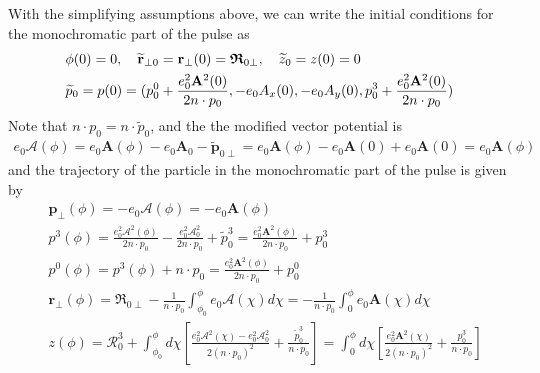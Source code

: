 With the simplifying assumptions above, we can write the initial conditions for the monochromatic part of the pulse as
\begin{align}
   & \phi(0) = 0, \quad \widetilde{\bf r}_{\perp0}={\bf r}_{\perp}(0) = {\boldsymbol{\mathfrak R}}_{0 \perp}, \quad \widetilde z_0=z(0) = 0\nonumber                         \\
   & \widetilde p_0=p(0) = (p_0^0 + \frac{e_{0}^{2} \mathbf{A}^{2}(0)}{2 n \cdot p_{0}},-e_0A_x(0), -e_0A_y(0), p_0^3 + \frac{e_{0}^{2} \mathbf{A}^{2}(0)}{2 n \cdot p_{0}})
\end{align}
Note that $n\cdot p_0 = n\cdot  \widetilde p_0$, and  the  the modified vector potential is
\begin{align}
  e_{0} \boldsymbol{\mathcal{A}}(\phi)=e_{0} \mathbf{A}(\phi)-e_{0} \mathbf{A}_{0}-\widetilde{\mathbf{p}}_{0 \perp}=e_{0} \mathbf{A}(\phi)-e_{0} \mathbf{A}(0)+e_0 {\mathbf{A}}(0) = e_{0} \mathbf{A}(\phi)
\end{align}
and the trajectory of the particle in the monochromatic part of the pulse is given by
\begin{align}
   & \mathbf{p}_{\perp}(\phi)=-e_{0} \boldsymbol{\mathcal { A }}(\phi) =-e_{0} \mathbf{A}(\phi)                                                                                                                                                                                                                                                                                                         \\
   & p^{3}(\phi)=\frac{e_{0}^{2} {\boldsymbol{\mathcal{A}}}^{2}(\phi)}{2 n \cdot p_{0}}-\frac{e_{0}^{2} {\boldsymbol{\mathcal{A}}}_{0}^{2}}{2 n \cdot p_{0}}+\widetilde p_{0}^{3}=\frac{e_{0}^{2} \mathbf{A}^{2}(\phi)}{2 n \cdot p_{0}}+p_{0}^{3}                                                                                                                                                      \\
   & p^{0}(\phi)=p^{3}(\phi)+n \cdot p_{0} =\frac{e_{0}^{2} \mathbf{A}^{2}(\phi)}{2 n \cdot p_{0}}+p_{0}^{0}                                                                                                                                                                                                                                                                                            \\
   & \mathbf{r}_{\perp}(\phi)=\boldsymbol{\mathfrak{R}}_{0 \perp}-\frac{1}{n \cdot p_{0}} \int_{\phi_{0}}^{\phi} e_{0} \boldsymbol{\mathcal {A }}(\chi) d \chi = -\frac{1}{n \cdot p_{0}} \int_{0}^{\phi} e_{0} \mathbf{A}(\chi) d \chi                                                                                                                                                                 \\
   & z(\phi)=\mathcal{R}_{0}^{3}+\int_{\phi_{0}}^{\phi} d \chi\left[\frac{e_{0}^{2} \boldsymbol{\mathcal { A }}^{2}(\chi)-e_{0}^{2} \boldsymbol{\mathcal { A }}_{0}^{2}}{2\left(n \cdot p_{0}\right)^{2}}+\frac{\widetilde p_{0}^{3}}{n \cdot p_{0}}\right] = \int_{0}^{\phi} d \chi\left[\frac{e_{0}^{2} \mathbf{A}^{2}(\chi)}{2\left(n \cdot p_{0}\right)^{2}}+\frac{p_{0}^{3}}{n \cdot p_{0}}\right]
\end{align}


